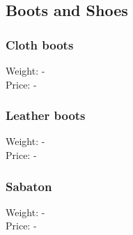 \subsection{Boots and Shoes}

\subsubsection{Cloth boots}
Weight: -\\
Price: -\\

\subsubsection{Leather boots}
Weight: -\\
Price: -\\

\subsubsection{Sabaton}
Weight: -\\
Price: -\\